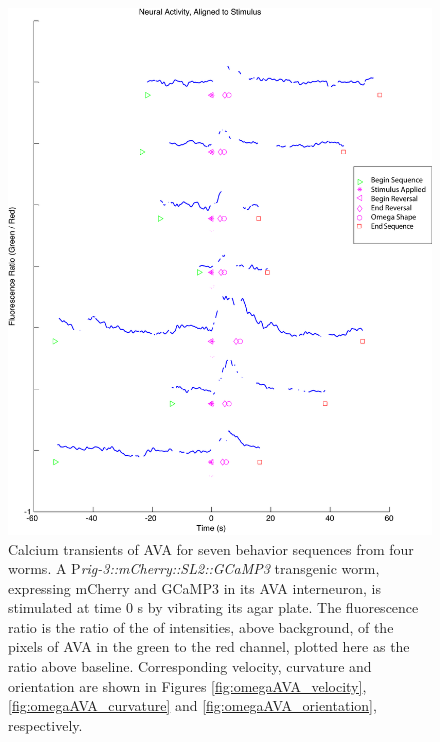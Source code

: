 \begin{figure}  %
\includegraphics[width=\textwidth]{figures/omegaAVA_aggregate}
\caption[Neural activity of AVA for seven sequences from four worms.]{Calcium transients of AVA for seven behavior sequences from four worms.  A P\textit{rig-3::mCherry::SL2::GCaMP3} transgenic worm, expressing mCherry and GCaMP3 in its AVA interneuron, is stimulated at time 0 s by vibrating its agar plate. The fluorescence ratio is the ratio of the of intensities,  above background, of the pixels of AVA in the green to the red channel, plotted here as the ratio above baseline.  Corresponding velocity, curvature and orientation are shown in Figures \ref{fig:omegaAVA_velocity}, \ref{fig:omegaAVA_curvature} and \ref{fig:omegaAVA_orientation}, respectively. 
 \label{fig:omegaAVA_aggregate}}
\end{figure}



